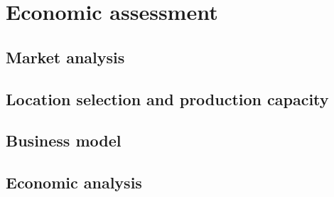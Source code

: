 \section{Economic assessment}
\label{sec:economics}
\subsection{Market analysis}

\subsection{Location selection and production capacity}

\subsection{Business model}

\subsection{Economic analysis}